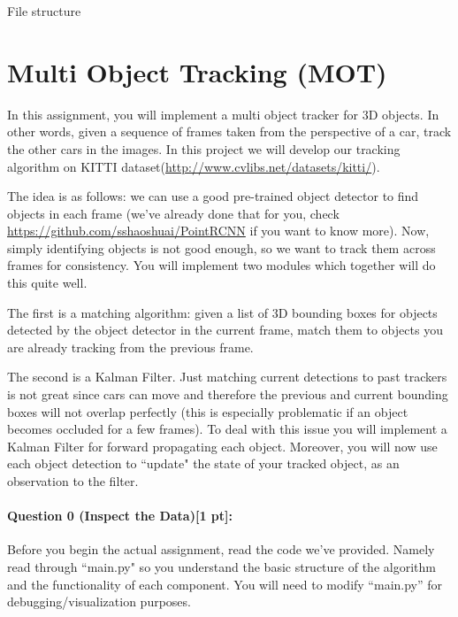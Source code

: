 \documentclass[11pt]{article}
\begin{document}
File structure

\section*{Multi Object Tracking (MOT)} 

In this assignment, you will implement a multi object tracker for 3D objects. In other words, given a sequence of frames taken from the perspective of a car, track the other cars in the images. In this project we will develop our tracking algorithm on KITTI dataset(\url{http://www.cvlibs.net/datasets/kitti/}). 

The idea is as follows: we can use a good pre-trained object detector to find objects in each frame (we've already done that for you, check \url{https://github.com/sshaoshuai/PointRCNN} if you want to know more). Now, simply identifying objects is not good enough, so we want to track them across frames for consistency. You will implement two modules which together will do this quite well. 

The first is a matching algorithm: given a list of 3D bounding boxes for objects detected by the object detector in the current frame, match them to objects you are already tracking from the previous frame. 

The second is a Kalman Filter. Just matching current detections to past trackers is not great since cars can move and therefore the previous and current bounding boxes will not overlap perfectly (this is especially problematic if an object becomes occluded for a few frames). To deal with this issue you will implement a Kalman Filter for forward propagating each object. Moreover, you will now use each object detection to ``update" the state of your tracked object, as an observation to the filter.

\paragraph{Question 0 (Inspect the Data)[1 pt]:}
Before you begin the actual assignment, read the code we've provided. Namely read through ``main.py" so you understand the basic structure of the algorithm and the functionality of each component. You will need to modify ``main.py'' for debugging/visualization purposes. 
\end{document}
